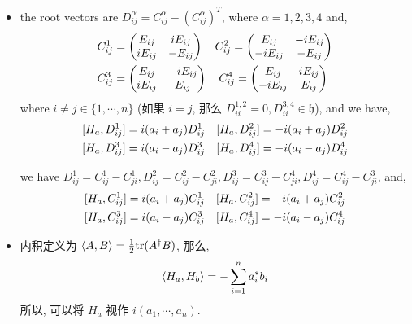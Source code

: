 \begin{itemize}
	\item the root vectors are $D^\alpha_{i j} = C^\alpha_{i j} - (C^{\alpha}_{i j})^T$, where $\alpha = 1, 2, 3, 4$ and,
	\begin{align}
		& C^1_{i j} = \begin{pmatrix}
			E_{i j} & i E_{i j} \\
			i E_{i j} & - E_{i j}
		\end{pmatrix} \quad C^2_{i j} = \begin{pmatrix}
			E_{i j} & - i E_{i j} \\
			- i E_{i j} & - E_{i j}
		\end{pmatrix} \notag \\
		& C^3_{i j} = \begin{pmatrix}
			E_{i j} & - i E_{i j} \\
			i E_{i j} & E_{i j}
		\end{pmatrix} \quad C^4_{i j} = \begin{pmatrix}
			E_{i j} & i E_{i j} \\
			- i E_{i j} & E_{i j}
		\end{pmatrix}
	\end{align}
	where $i \neq j \in \{1, \cdots, n\}$ (如果 $i = j$, 那么 $D^{1, 2}_{i i} = 0, D^{3, 4}_{i i} \in \mathfrak{h}$), and we have,
	\begin{align}
		& [H_a, D^1_{i j}] = i (a_i + a_j) D^1_{i j} \quad [H_a, D^2_{i j}] = - i (a_i + a_j) D^2_{i j} \notag \\
		& [H_a, D^3_{i j}] = i (a_i - a_j) D^3_{i j} \quad [H_a, D^4_{i j}] = - i (a_i - a_j) D^4_{i j}
	\end{align}
	
	\begin{tcolorbox}[title=calculation:]
		we have $D^1_{i j} = C^1_{i j} - C^1_{j i}, D^2_{i j} = C^2_{i j} - C^2_{j i}, D^3_{i j} = C^3_{i j} - C^4_{j i}, D^4_{i j} = C^4_{i j} - C^3_{j i}$, and,
		\begin{align}
			& [H_a, C^1_{i j}] = i (a_i + a_j) C^1_{i j} \quad [H_a, C^2_{i j}] = - i (a_i + a_j) C^2_{i j} \notag \\
			& [H_a, C^3_{i j}] = i (a_i - a_j) C^3_{i j} \quad [H_a, C^4_{i j}] = - i (a_i - a_j) C^4_{i j}
		\end{align}
	\end{tcolorbox}
	
	\item 内积定义为 $\braket{A, B} = \frac{1}{2} \mathrm{tr}(A^\dag B)$, 那么,
	\begin{equation}
		\braket{H_a, H_b} = - \sum_{i = 1}^n a_i^* b_i
	\end{equation}
	所以, 可以将 $H_a$ 视作 $i (a_1, \cdots, a_n)$.
	

\end{itemize}
